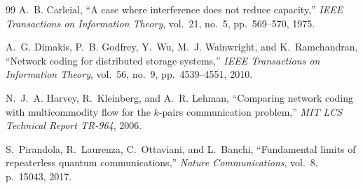 \documentclass[12pt, a4paper]{article}
\begin{document}
\begin{thebibliography}{99}
A.~B. Carleial,
``A case where interference does not reduce capacity,''
\emph{IEEE Transactions on Information Theory}, vol.~21, no.~5, pp.~569--570, 1975.

A.~G. Dimakis, P.~B. Godfrey, Y.~Wu, M.~J. Wainwright, and K.~Ramchandran,
``Network coding for distributed storage systems,''
\emph{IEEE Transactions on Information Theory}, vol.~56, no.~9, pp.~4539--4551, 2010.

N.~J.~A. Harvey, R.~Kleinberg, and A.~R. Lehman,
``Comparing network coding with multicommodity flow for the $k$-pairs communication problem,''
\emph{MIT LCS Technical Report TR-964}, 2006.

S.~Pirandola, R.~Laurenza, C.~Ottaviani, and L.~Banchi,
``Fundamental limits of repeaterless quantum communications,''
\emph{Nature Communications}, vol.~8, p.~15043, 2017.

\end{thebibliography}
\end{document}

